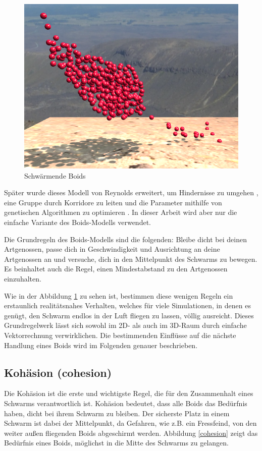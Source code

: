 \documentclass[draft=false
              ,paper=a4
              ,twoside=false
              ,fontsize=11pt
              ,headsepline
              ,BCOR10mm
              ,DIV11
              ,bibtotoc
              ,liststotoc
              ]{scrbook}
\begin{document}
\begin{figure}[!h]
\centering
\includegraphics[scale=0.4]{project/bigswarm.png}
\caption{Schwärmende Boids}
\label{simple}
\end{figure}

Später wurde dieses Modell von Reynolds erweitert, um Hindernisse zu umgehen \cite{alife92*327}, eine Gruppe durch Korridore zu leiten \cite{reynolds:1994:ecfbnw} und die Parameter mithilfe von genetischen Algorithmen zu optimieren \cite{sab92:reynolds}. In dieser Arbeit wird aber nur die einfache Variante des Boids-Modells verwendet.

Die Grundregeln des Boids-Modells sind die folgenden: Bleibe dicht bei deinen Artgenossen, passe dich in Geschwindigkeit und Ausrichtung an deine Artgenossen an und versuche, dich in den Mittelpunkt des Schwarms zu bewegen.
Es beinhaltet auch die Regel, einen Mindestabstand zu den Artgenossen einzuhalten.

Wie in der Abbildung \ref{simple} zu sehen ist, bestimmen diese wenigen Regeln ein erstaunlich realitätsnahes Verhalten, welches für viele Simulationen, in denen es genügt, den Schwarm endlos in der Luft fliegen zu lassen, völlig ausreicht. Dieses Grundregelwerk lässt sich sowohl im 2D- als auch im 3D-Raum durch einfache Vektorrechnung verwirklichen. Die bestimmenden Einflüsse auf die nächste Handlung eines Boids wird im Folgenden genauer beschrieben.
\subsection{Kohäsion (cohesion)}
Die Kohäsion ist die erste und wichtigste Regel, die für den Zusammenhalt eines Schwarms verantwortlich ist. Kohäsion bedeutet, dass alle Boids das Bedürfnis haben, dicht bei ihrem Schwarm zu bleiben. Der sicherste Platz in einem Schwarm ist dabei der Mittelpunkt, da Gefahren, wie z.B. ein Fressfeind, von den weiter außen fliegenden Boids abgeschirmt werden. Abbildung \ref{cohesion} zeigt das Bedürfnis eines Boids, möglichst in die Mitte des Schwarms zu gelangen.
\end{document}

